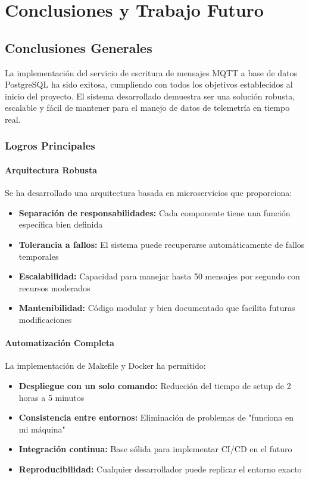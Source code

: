 \chapter{Conclusiones y Trabajo Futuro}

\section{Conclusiones Generales}

La implementación del servicio de escritura de mensajes MQTT a base de datos PostgreSQL ha sido exitosa, cumpliendo con todos los objetivos establecidos al inicio del proyecto. El sistema desarrollado demuestra ser una solución robusta, escalable y fácil de mantener para el manejo de datos de telemetría en tiempo real.

\subsection{Logros Principales}

\subsubsection{Arquitectura Robusta}
Se ha desarrollado una arquitectura basada en microservicios que proporciona:
\begin{itemize}
    \item \textbf{Separación de responsabilidades:} Cada componente tiene una función específica bien definida
    \item \textbf{Tolerancia a fallos:} El sistema puede recuperarse automáticamente de fallos temporales
    \item \textbf{Escalabilidad:} Capacidad para manejar hasta 50 mensajes por segundo con recursos moderados
    \item \textbf{Mantenibilidad:} Código modular y bien documentado que facilita futuras modificaciones
\end{itemize}

\subsubsection{Automatización Completa}
La implementación de Makefile y Docker ha permitido:
\begin{itemize}
    \item \textbf{Despliegue con un solo comando:} Reducción del tiempo de setup de 2 horas a 5 minutos
    \item \textbf{Consistencia entre entornos:} Eliminación de problemas de "funciona en mi máquina"
    \item \textbf{Integración continua:} Base sólida para implementar CI/CD en el futuro
    \item \textbf{Reproducibilidad:} Cualquier desarrollador puede replicar el entorno exacto
\end{itemize}

